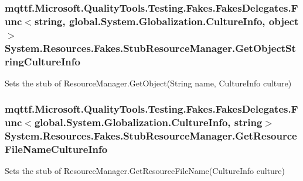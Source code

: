 \hypertarget{class_system_1_1_resources_1_1_fakes_1_1_stub_resource_manager_aefd5d52ff98fa4b76a0280b95705e0c9}{
\subsubsection[{Get\-Object\-String\-Culture\-Info}]{\setlength{\rightskip}{0pt plus 5cm}mqttf.\-Microsoft.\-Quality\-Tools.\-Testing.\-Fakes.\-Fakes\-Delegates.\-Func$<$string, global.\-System.\-Globalization.\-Culture\-Info, object$>$ System.\-Resources.\-Fakes.\-Stub\-Resource\-Manager.\-Get\-Object\-String\-Culture\-Info}}\label{class_system_1_1_resources_1_1_fakes_1_1_stub_resource_manager_aefd5d52ff98fa4b76a0280b95705e0c9}


Sets the stub of Resource\-Manager.\-Get\-Object(\-String name, Culture\-Info culture)

\hypertarget{class_system_1_1_resources_1_1_fakes_1_1_stub_resource_manager_aee81686f9c632a6505d40f79870b760c}{
\subsubsection[{Get\-Resource\-File\-Name\-Culture\-Info}]{\setlength{\rightskip}{0pt plus 5cm}mqttf.\-Microsoft.\-Quality\-Tools.\-Testing.\-Fakes.\-Fakes\-Delegates.\-Func$<$global.\-System.\-Globalization.\-Culture\-Info, string$>$ System.\-Resources.\-Fakes.\-Stub\-Resource\-Manager.\-Get\-Resource\-File\-Name\-Culture\-Info}}\label{class_system_1_1_resources_1_1_fakes_1_1_stub_resource_manager_aee81686f9c632a6505d40f79870b760c}


Sets the stub of Resource\-Manager.\-Get\-Resource\-File\-Name(\-Culture\-Info culture)

